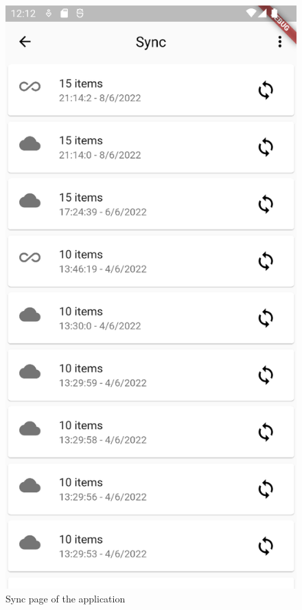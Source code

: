 \documentclass[a4paper,12pt]{report}
\begin{document}
\begin{figure}[H]
    \centering
    \includegraphics[scale=0.45]{images/app/sync.png}
    \caption{Sync page of the application}\label{fig:syncpage}
\end{figure}
\end{document}
